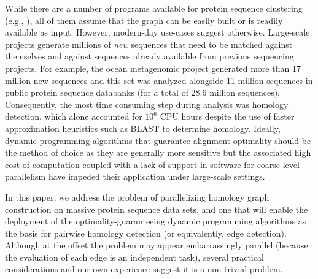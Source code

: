 \documentclass[10pt,journal,letterpaper,compsoc]{IEEEtran}
\begin{document}
While there are a number of programs available for protein sequence clustering (e.g., \cite{Apweiler04,Bateman04,Enright02,Kriventseva01,Olman07}), all of them assume that the graph can be easily built or is readily available as input. However, modern-day use-cases suggest otherwise. Large-scale projects generate millions of \emph{new} sequences that need to be matched against themselves and against sequences already available from previous sequencing projects. For example, the ocean metagenomic project generated more than 17 million new sequences and this set was analyzed alongside 11 million sequences in public protein sequence databanks (for a total of 28.6 million sequences). Consequently, the most time consuming step during analysis was homology detection, which alone accounted for $10^6$ CPU hours despite the use of faster approximation heuristics such as BLAST \cite{Altschul90} to determine homology. Ideally, dynamic programming algorithms \cite{Needleman70,Smith81} that guarantee alignment optimality should be the method of choice as they are generally more sensitive but the associated high cost of computation coupled with a lack of support in software for coarse-level parallelism have impeded their application under large-scale settings.

In this paper, we address the problem of parallelizing homology graph construction on massive protein sequence data sets, and one that will enable the deployment of the optimality-guaranteeing dynamic programming algorithms as the basis for pairwise homology detection (or equivalently, edge detection). Although at the offset the problem may appear embarrassingly parallel (because the evaluation of each edge is an independent task), several practical considerations and our own experience \cite{Wu08} suggest it is a non-trivial problem.
\end{document}
